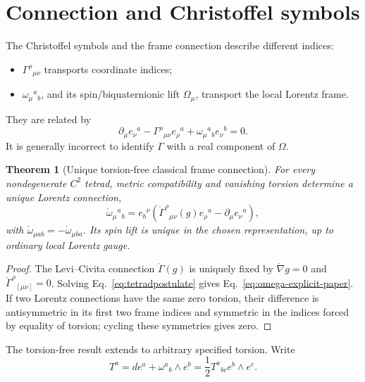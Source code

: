 \documentclass[12pt,a4paper]{article}
\newtheorem{theorem}[definition]{Theorem}
\theoremstyle{remark}\newtheorem{remark}[definition]{Remark}
\begin{document}
\section{Connection and Christoffel symbols}
The Christoffel symbols and the frame connection describe different indices:
\begin{itemize}
 \item $\Gamma^\rho{}_{\mu\nu}$ transports coordinate indices;
 \item $\omega_\mu{}^a{}_b$, and its spin/biquaternionic lift $\Omega_\mu$,
       transport the local Lorentz frame.
\end{itemize}
They are related by
\begin{equation}
 \partial_\mu e_\nu{}^a-\Gamma^\rho{}_{\mu\nu}e_\rho{}^a
 +\omega_\mu{}^a{}_b e_\nu{}^b=0.
 \label{eq:tetradpostulate}
\end{equation}
It is generally incorrect to identify $\Gamma$ with a real component of
$\Omega$.

\begin{theorem}[Unique torsion-free classical frame connection]
\label{thm:omega-unique-paper}
For every nondegenerate $C^2$ tetrad, metric compatibility and vanishing
torsion determine a unique Lorentz connection,
\begin{equation}
 \boxed{
 \mathring\omega_\mu{}^a{}_b
 =e_b{}^\nu\left(
 \mathring\Gamma^\rho{}_{\mu\nu}(g)e_\rho{}^a
 -\partial_\mu e_\nu{}^a
 \right),}
 \label{eq:omega-explicit-paper}
\end{equation}
with $\mathring\omega_{\mu ab}=-\mathring\omega_{\mu ba}$.  Its spin lift is
unique in the chosen representation, up to ordinary local Lorentz gauge.
\end{theorem}

\begin{proof}
The Levi--Civita connection $\mathring\Gamma(g)$ is uniquely fixed by
$\mathring\nabla g=0$ and
$\mathring\Gamma^\rho{}_{[\mu\nu]}=0$.  Solving
Eq.~\eqref{eq:tetradpostulate} gives
Eq.~\eqref{eq:omega-explicit-paper}.  If two Lorentz connections have the same
zero torsion, their difference is antisymmetric in its first two frame indices
and symmetric in the indices forced by equality of torsion; cycling these
symmetries gives zero.
\end{proof}

The torsion-free result extends to arbitrary specified torsion.  Write
\begin{equation}
 T^a=de^a+\omega^a{}_b\wedge e^b
 =\frac12T^a{}_{bc}e^b\wedge e^c.
\end{equation}
\end{document}
